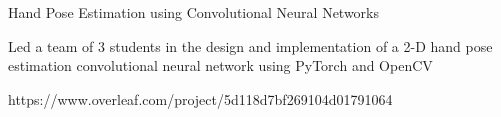 
\begin{cventries}
  \cventry
    {} %
    {Hand Pose Estimation using Convolutional Neural Networks} %
    {} %
    {} %
    {
      \begin{cvitems} %
        \item {Led a team of 3 students in the design and implementation of a 2-D hand pose estimation convolutional neural network using PyTorch and OpenCV}
      \end{cvitems}
    }

\end{cventries}https://www.overleaf.com/project/5d118d7bf269104d01791064